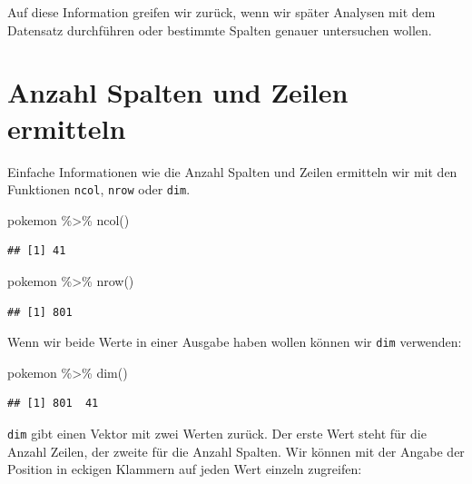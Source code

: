 \documentclass[
]{book}
\newenvironment{Shaded}{\begin{snugshade}}{\end{snugshade}}
\newcommand{\FunctionTok}[1]{\textcolor[rgb]{0.00,0.00,0.00}{#1}}
\newcommand{\NormalTok}[1]{#1}
\newcommand{\SpecialCharTok}[1]{\textcolor[rgb]{0.00,0.00,0.00}{#1}}
\begin{document}
Auf diese Information greifen wir zurück, wenn wir später Analysen mit dem Datensatz durchführen oder bestimmte Spalten genauer untersuchen wollen.

\hypertarget{anzahl-spalten-zeilen}{%
\section{Anzahl Spalten und Zeilen ermitteln}\label{anzahl-spalten-zeilen}}

Einfache Informationen wie die Anzahl Spalten und Zeilen ermitteln wir mit den Funktionen \texttt{ncol}, \texttt{nrow} oder \texttt{dim}.

\begin{Shaded}
\begin{Highlighting}[]
\NormalTok{pokemon }\SpecialCharTok{\%\textgreater{}\%}
  \FunctionTok{ncol}\NormalTok{()}
\end{Highlighting}
\end{Shaded}

\begin{verbatim}
## [1] 41
\end{verbatim}

\begin{Shaded}
\begin{Highlighting}[]
\NormalTok{pokemon }\SpecialCharTok{\%\textgreater{}\%}
  \FunctionTok{nrow}\NormalTok{()}
\end{Highlighting}
\end{Shaded}

\begin{verbatim}
## [1] 801
\end{verbatim}

Wenn wir beide Werte in einer Ausgabe haben wollen können wir \texttt{dim} verwenden:

\begin{Shaded}
\begin{Highlighting}[]
\NormalTok{pokemon }\SpecialCharTok{\%\textgreater{}\%}
  \FunctionTok{dim}\NormalTok{()}
\end{Highlighting}
\end{Shaded}

\begin{verbatim}
## [1] 801  41
\end{verbatim}

\texttt{dim} gibt einen Vektor mit zwei Werten zurück. Der erste Wert steht für die Anzahl Zeilen, der zweite für die Anzahl Spalten. Wir können mit der Angabe der Position in eckigen Klammern auf jeden Wert einzeln zugreifen:
\end{document}
